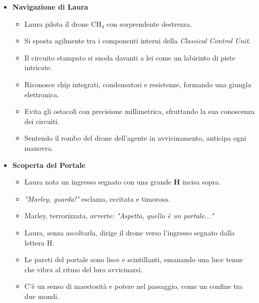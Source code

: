 \begin{itemize}
    \item \textbf{Navigazione di Laura}
    \begin{itemize}
        \item Laura pilota il drone CH$_4$ con sorprendente destrezza.
        \item Si sposta agilmente tra i componenti interni della \emph{Classical Control Unit}.
        \item Il circuito stampato si snoda davanti a lei come un labirinto di piste intricate.
        \item Riconosce chip integrati, condensatori e resistenze, formando una giungla elettronica.
        \item Evita gli ostacoli con precisione millimetrica, sfruttando la sua conoscenza dei circuiti.
        \item Sentendo il rombo del drone dell'agente in avvicinamento, anticipa ogni manovra.
    \end{itemize}
    
    \item \textbf{Scoperta del Portale}
    \begin{itemize}
        \item Laura nota un ingresso segnato con una grande \textbf{H} incisa sopra.
        \item \emph{"Marley, guarda!"} esclama, eccitata e timorosa.
        \item Marley, terrorizzata, avverte: \emph{"Aspetta, quello è un portale..."}
        \item Laura, senza ascoltarla, dirige il drone verso l'ingresso segnato dalla lettera H.
        \item Le pareti del portale sono lisce e scintillanti, emanando una luce tenue che vibra al ritmo del loro avvicinarsi.
        \item C'è un senso di maestosità e potere nel passaggio, come un confine tra due mondi.
    \end{itemize}
\end{itemize}


